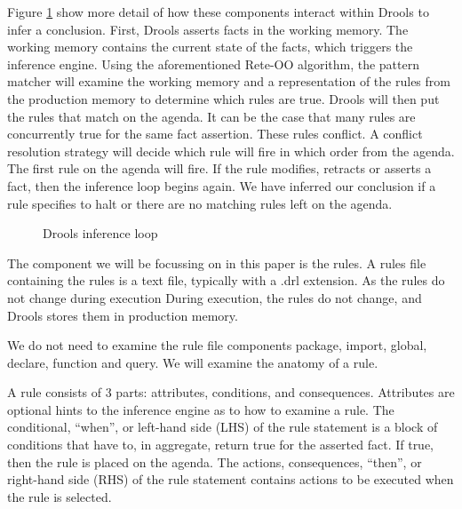 Figure \ref{fig:Drools_inference_loop} show more detail of how these components interact within Drools to infer a conclusion.
First, Drools asserts facts in the working memory.
The working memory contains the current state of the facts, which triggers the inference engine.
Using the aforementioned Rete-OO algorithm, the pattern matcher will examine the working memory and a representation of the rules from the production memory to determine which rules are true.
Drools will then put the rules that match on the agenda.
It can be the case that many rules are concurrently true for the same fact assertion.
These rules conflict.
A conflict resolution strategy will decide which rule will fire in which order from the agenda.
The first rule on the agenda will fire.
If the rule modifies, retracts or asserts a fact, then the inference loop begins again.
We have inferred our conclusion if a rule specifies to halt or there are no matching rules left on the agenda.

\begin{figure}[h]
    \centering
    \caption{Drools inference loop}
    \label{fig:Drools_inference_loop}
\end{figure}

The component we will be focussing on in this paper is the rules.
A rules file containing the rules is a text file, typically with a .drl extension.
As the rules do not change during execution
During execution, the rules do not change, and Drools stores them in production memory.

We do not need to examine the rule file components package, import, global, declare, function and query.
We will examine the anatomy of a rule.

A rule consists of 3 parts: attributes, conditions, and consequences.
Attributes are optional hints to the inference engine as to how to examine a rule.
The conditional, ``when'', or left-hand side (LHS) of the rule statement is a block of conditions that have to, in aggregate, return true for the asserted fact. If true, then the rule is placed on the agenda.
The actions, consequences, ``then'', or right-hand side (RHS) of the rule statement contains actions to be executed when the rule is selected.

